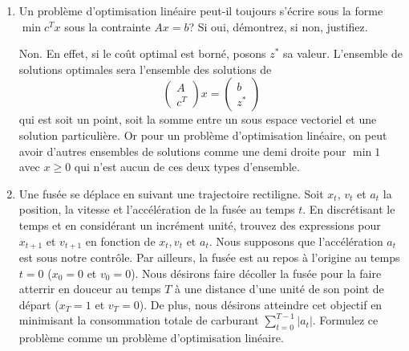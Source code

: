 \begin{enumerate}
  \item Un problème d'optimisation linéaire peut-il toujours s'écrire sous la forme $\min c^Tx$ sous la contrainte $Ax = b$? Si oui, démontrez, si non, justifiez.

    \begin{solution}
      Non. En effet,
      si le coût optimal est borné, posons $z^*$ sa valeur.
      L'ensemble de solutions optimales sera l'ensemble des solutions de
      \[
        \begin{pmatrix}
          A\\c^T
        \end{pmatrix}
        x =
        \begin{pmatrix}
          b\\z^*
        \end{pmatrix}
      \]
      qui est soit un point, soit la somme entre un sous espace vectoriel
      et une solution particulière.
      Or pour un problème d'optimisation linéaire,
      on peut avoir d'autres ensembles de solutions comme une demi droite
      pour $\min 1$ avec $x \geq 0$
      qui n'est aucun de ces deux types d'ensemble.
    \end{solution}

  \item Une fusée se déplace en suivant une trajectoire rectiligne. Soit $x_t$, $v_t$
    et $a_t$ la position, la vitesse et l'accélération de la fusée au temps $t$. En discrétisant le temps et en considérant un incrément
    unité, trouvez des expressions pour $x_{t+1}$ et $v_{t+1}$ en fonction de $x_t, v_t$ et $a_t$. Nous supposons que l'accélération $a_t$ est sous notre
    contrôle. Par ailleurs, la fusée est au repos à l'origine au temps
    $t=0$ ($x_0=0$ et
    $v_0=0$). Nous désirons faire décoller la fusée pour la faire atterrir  en douceur au temps $T$ à une
    distance d'une unité de son point de départ ($x_T=1$ et $v_T=0$). De plus, nous désirons atteindre cet
    objectif en minimisant la consommation totale de carburant
    $\sum_{t=0}^{T-1} |a_t|$.  Formulez ce problème comme un problème d'optimisation linéaire.


\end{enumerate}
